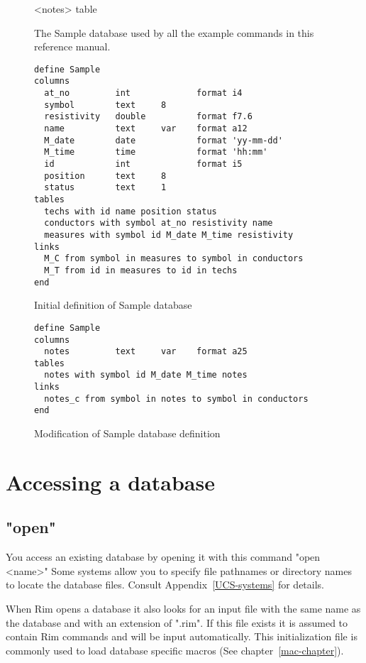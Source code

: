 \begin{figure}[htp]
\begin{center}
  \smallskip
          {<notes> table }
\end{center}
\caption[The Sample database]
  {The Sample database used by all the example commands
   in this reference manual.}
\label{Sample}
\end{figure}
 
 
 
\begin{figure}[htp]
\begin{verbatim}
define Sample
columns
  at_no         int             format i4
  symbol        text     8
  resistivity   double          format f7.6
  name          text     var    format a12
  M_date        date            format 'yy-mm-dd'
  M_time        time            format 'hh:mm'
  id            int             format i5
  position      text     8
  status        text     1
tables
  techs with id name position status
  conductors with symbol at_no resistivity name
  measures with symbol id M_date M_time resistivity
links
  M_C from symbol in measures to symbol in conductors
  M_T from id in measures to id in techs
end
\end{verbatim}
\caption{Initial definition of Sample database}
\label{Sample-def1}
\end{figure}
 
 
\begin{figure}[htp]
\begin{verbatim}
define Sample
columns
  notes         text     var    format a25
tables
  notes with symbol id M_date M_time notes
links
  notes_c from symbol in notes to symbol in conductors
end
\end{verbatim}
\caption{Modification of Sample database definition}
\label{Sample-def2}
\end{figure}
 
\section{Accessing a database}
%
\subsection{"open"}
You access an existing database by opening it with this command
\<"open <name>"\>
Some systems allow you to specify file pathnames or
directory names to locate the database files.
Consult Appendix~\ref{UCS-systems} for details.
 
When Rim opens a database it also looks for an input
file with the same name as the database and with an extension
of ".rim".  If this file exists it is assumed to contain
Rim commands and will be input automatically.
This initialization file is commonly used to load
database specific macros (See chapter~\ref{mac-chapter}).
 
